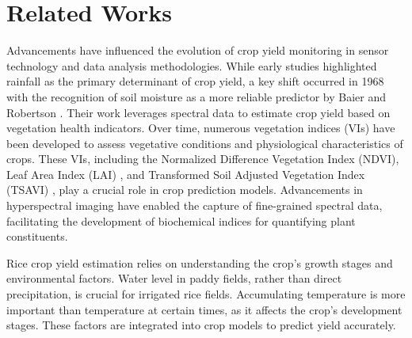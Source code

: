 \section{Related Works}
\label{sec:related}
Advancements have influenced the evolution of crop yield monitoring in sensor technology and data analysis methodologies. While early studies highlighted rainfall as the primary determinant of crop yield, a key shift occurred in 1968 with the recognition of soil moisture as a more reliable predictor by Baier and Robertson \cite{baier1968performance}. Their work leverages spectral data to estimate crop yield based on vegetation health indicators. Over time, numerous vegetation indices (VIs) have been developed to assess vegetative conditions and physiological characteristics of crops. These VIs, including the Normalized Difference Vegetation Index (NDVI), Leaf Area Index (LAI) \cite{bouman1995crop}, and Transformed Soil Adjusted Vegetation Index (TSAVI) \cite{baret1991potentials}, play a crucial role in crop prediction models. Advancements in hyperspectral imaging have enabled the capture of fine-grained spectral data, facilitating the development of biochemical indices for quantifying plant constituents.

Rice crop yield estimation relies on understanding the crop's growth stages and environmental factors. Water level in paddy fields, rather than direct precipitation, is crucial for irrigated rice fields. Accumulating temperature is more important than temperature at certain times, as it affects the crop's development stages. These factors are integrated into crop models to predict yield accurately.

